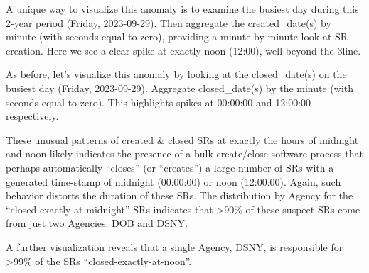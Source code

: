\documentclass[12pt, titlepage]{article}
\begin{document}
A unique way to visualize this anomaly is to examine the busiest day 
during this 2-year period (Friday, 2023-09-29). Then aggregate 
the created\_date(s) by minute (with seconds equal to zero), providing
a minute-by-minute look at SR creation. Here we see a clear 
spike at exactly noon (12:00), well beyond the 3\textsigma line.



As before, let's visualize this anomaly by looking at the closed\_date(s) 
on the busiest day (Friday, 2023-09-29). Aggregate closed\_date(s) by 
the minute (with seconds equal to zero). This highlights spikes 
at 00:00:00 and 12:00:00 respectively. 




These unusual patterns of created \& closed SRs at exactly the hours 
of midnight and noon likely indicates the presence of a bulk create/close 
software process that perhaps automatically ``closes'' 
(or ``creates'') a large number of SRs with a generated time-stamp of 
midnight (00:00:00) or noon (12:00:00). Again, such behavior distorts
 the duration of these SRs. The distribution by Agency for 
 the ``closed-exactly-at-midnight'' SRs indicates that \textgreater90\% of 
 these suspect SRs come from just two Agencies: DOB and DSNY. 

	


A further visualization reveals that  a single Agency, DSNY, is 
responsible for \textgreater99\% of the SRs ``closed-exactly-at-noon''. 
	
	
\end{document}
